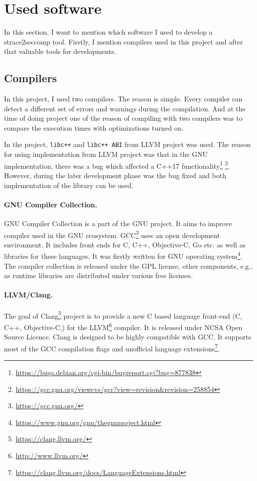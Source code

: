 \section{Used software}
In this section, I want to mention which software I used to develop a strace2seccomp tool.
Firstly, I mention compilers used in this project and after that valuable tools for developments.

\subsection{Compilers}
\label{subsec:compilers}
In this project, I used two compilers. The reason is simple.
Every compiler can detect a different set of errors and warnings during the compilation.
And at the time of doing project one of the reason of compiling with two compilers
was to compare the execution times with optimizations turned on.

In the project, \texttt{libc++} and \texttt{libc++ ABI} from LLVM project was
used. The reason for using implementation from LLVM project was that in the GNU
implementation, there was a bug which affected a C++17
functionality\footnote{\url{https://bugs.debian.org/cgi-bin/bugreport.cgi?bug=877838}}
\footnote{\url{https://gcc.gnu.org/viewcvs/gcc?view=revision&revision=258854}}.
However, during the later development phase was the bug fixed and both implementation
of the library can be used.

\paragraph{GNU Compiler Collection.}GNU Compiler Collection is a part of the GNU project.
It aims to improve compiler used in the GNU ecosystem.
GCC\footnote{\url{https://gcc.gnu.org/}} uses an open development environment.
It includes front ends for C, C++, Objective-C, Go etc.
as well as libraries for these languages. It was firstly written for GNU operating system\footnote{\url{https://www.gnu.org/gnu/thegnuproject.html}}.
The compiler collection is released under the GPL license, other components, e.g., as runtime libraries are distributed under various free licenses.

\paragraph{LLVM/Clang.}
The goal of Clang\footnote{\url{https://clang.llvm.org/}} project is to provide a new C based language front-end (C, C++, Objective-C,) for the LLVM\footnote{\url{http://www.llvm.org/}} compiler.
It is released under NCSA Open Source Licence. Clang is designed to be highly compatible with GCC.
It supports most of the GCC compilation flags and unofficial language extensions\footnote{\url{https://clang.llvm.org/docs/LanguageExtensions.html}}.

